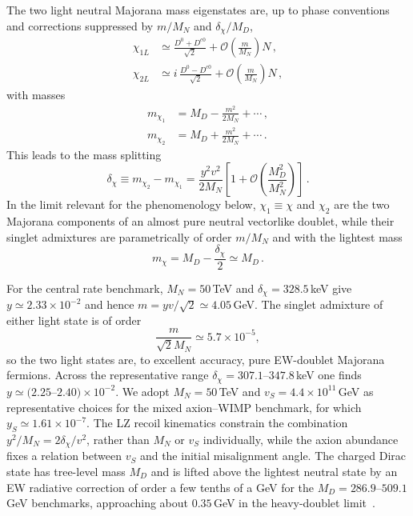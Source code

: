 \documentclass[aps,prd,reprint,preprintnumbers,superscriptaddress,nofootinbib,floatfix]{revtex4-2}
\newcommand{\dchi}{\delta_\chi}
\begin{document}
The two light neutral Majorana mass eigenstates are, up to phase conventions and corrections suppressed by $m/M_N$ and $\dchi/M_D$,
\begin{align}
    \chi_{1L} &\simeq \frac{D^0+D^{c0}}{\sqrt{2}} +\mathcal O\!\left(\frac{m}{M_N}\right)N\,,\\
    \chi_{2L} &\simeq i\,\frac{D^0-D^{c0}}{\sqrt{2}} +\mathcal O\!\left(\frac{m}{M_N}\right)N\,,
    \label{eq:chieigenstates}
\end{align}
with masses
\begin{align}
    m_{\chi_1} &=M_D-\frac{m^2}{2M_N}+\cdots\,,\\
    m_{\chi_2} &=M_D+\frac{m^2}{2M_N}+\cdots\,.
\end{align}
This leads to the mass splitting
\begin{equation}
    \dchi\equiv m_{\chi_2}-m_{\chi_1} = \frac{y^2v^2}{2M_N}\left[1+\mathcal O\!\left(\frac{M_D^2}{M_N^2}\right)\right]\,.
    \label{eq:master}
\end{equation}
In the limit relevant for the phenomenology below, $\chi_1 \equiv \chi$ and $\chi_2$ are the two Majorana components of an almost pure neutral vectorlike doublet, while their singlet admixtures are parametrically of order $m/M_N$ and with the lightest mass
\begin{equation}
    m_\chi =M_D-\frac{\dchi}{2} \simeq M_D\,.
    \label{eq:mchidef}
\end{equation}

For the central rate benchmark, $M_N=50$\,TeV and $\dchi=328.5$\,keV give $y\simeq2.33\times10^{-2}$ and hence $m=yv/\sqrt{2}\simeq4.05$\,GeV. The singlet admixture of either light state is of order
\begin{equation}
    \frac{m}{\sqrt{2}M_N}\simeq5.7\times10^{-5},
\end{equation}
so the two light states are, to excellent accuracy, pure EW-doublet Majorana fermions. Across the representative range $\dchi=307.1$--$347.8$\,keV one finds $y\simeq(2.25$--$2.40)\times10^{-2}$. We adopt $M_N=50$\,TeV and $v_S=4.4\times10^{11}$\,GeV as representative choices for the mixed axion--WIMP benchmark, for which $y_S\simeq1.61\times10^{-7}$. The LZ recoil kinematics constrain the combination $y^2/M_N=2\dchi/v^2$, rather than $M_N$ or $v_S$ individually, while the axion abundance fixes a relation between $v_S$ and the initial misalignment angle. The charged Dirac state has tree-level mass $M_D$ and is lifted above the lightest neutral state by an EW radiative correction of order a few tenths of a GeV for the $M_D=286.9$--$509.1$\,GeV benchmarks, approaching about $0.35$\,GeV in the heavy-doublet limit~\cite{Thomas:1998wy,Ibe:2023dcu}.
\end{document}
